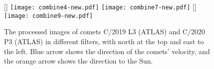 

    
\begin{figure}
    \centering
    [\linewidth]{
        \texttt{[image: combine4-new.pdf]}
        \texttt{[image: combine7-new.pdf]}
    }
    [\linewidth]{
        \texttt{[image: combine9-new.pdf]}
    }
    \caption{The processed images of comets C/2019 L3 (ATLAS) and C/2020 P3 (ATLAS) in different filters, with north at the top and east to the left. Blue arrow shows the direction of the comets' velocity, and the orange arrow shows the direction to the Sun. }
    \label{fig:combinedimg}
\end{figure}


